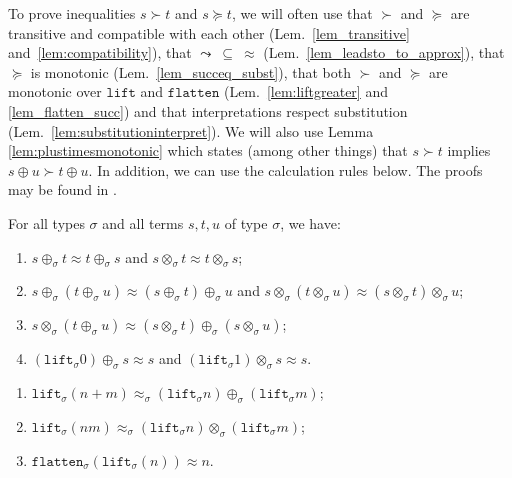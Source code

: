 \documentclass[a4paper,UKenglish,cleveref,autoref,numberwithinsect]{lipics-v2019}
\theoremstyle{definition}
\newcommand{\arrW}{\leadsto}
\newcommand{\flatten}{\mathtt{flatten}}
\newcommand{\lift}{\mathtt{lift}}
\begin{document}
To prove inequalities $s \succ t$ and $s \succeq t$, we will often
use that $\succ$ and $\succeq$ are transitive and compatible with each
other (Lem.~\ref{lem_transitive} and~\ref{lem:compatibility}), that
$\arrW\:\subseteq\:\approx$ (Lem.~\ref{lem_leadsto_to_approx}),
that $\succeq$ is monotonic (Lem.~\ref{lem_succeq_subst}),
that both $\succ$ and $\succeq$ are monotonic over $\lift$ and $\flatten$
(Lem.~\ref{lem:liftgreater} and \ref{lem_flatten_succ}) and that
interpretations respect substitution
(Lem.~\ref{lem:substitutioninterpret}). We will also use
Lemma \ref{lem:plustimesmonotonic} which states (among other things)
that $s \succ t$ implies $s \oplus u \succ t \oplus u$.
In addition, we can use the
calculation rules below. The proofs may be found in
\cite[Appendix~A.3]{versionwithappendix}.

\begin{lemma}\label{lem:approxproperties}
For all types $\sigma$ and all terms $s,t,u$ of type $\sigma$, we
have:
\begin{enumerate}
\item\label{lem:approx:symmetry} $s \oplus_\sigma t \approx t
  \oplus_\sigma s$ and $s \otimes_\sigma t \approx t \otimes_\sigma
  s$;
\item\label{lem:approx:assoc} $s \oplus_\sigma (t \oplus_\sigma u)
  \approx (s \oplus_\sigma t) \oplus_\sigma u$ and $s \otimes_\sigma
  (t \otimes_\sigma u) \approx (s \otimes_\sigma t) \otimes_\sigma u$;
\item\label{lem:approx:distribution} $s \otimes_\sigma (t
  \oplus_\sigma u) \approx (s \otimes_\sigma t) \oplus_\sigma (s
  \otimes_\sigma u)$;
\item\label{lem:approx:neutral} $(\lift_\sigma 0) \oplus_\sigma s
  \approx s$ and $(\lift_\sigma 1) \otimes_\sigma s \approx s$.
\end{enumerate}
\end{lemma}

\begin{lemma}\label{lem_lift_approx}
  \begin{enumerate}
  \item\label{lem_lift_approx:plussplit}
    $\lift_\sigma(n+m) \approx_\sigma (\lift_\sigma n)
    \oplus_\sigma (\lift_\sigma m)$;
  \item $\lift_\sigma(n m) \approx_\sigma (\lift_\sigma n)
    \otimes_\sigma (\lift_\sigma m)$;
  \item $\flatten_\sigma(\lift_\sigma(n)) \approx n$.
  \end{enumerate}
\end{lemma}
\end{document}
